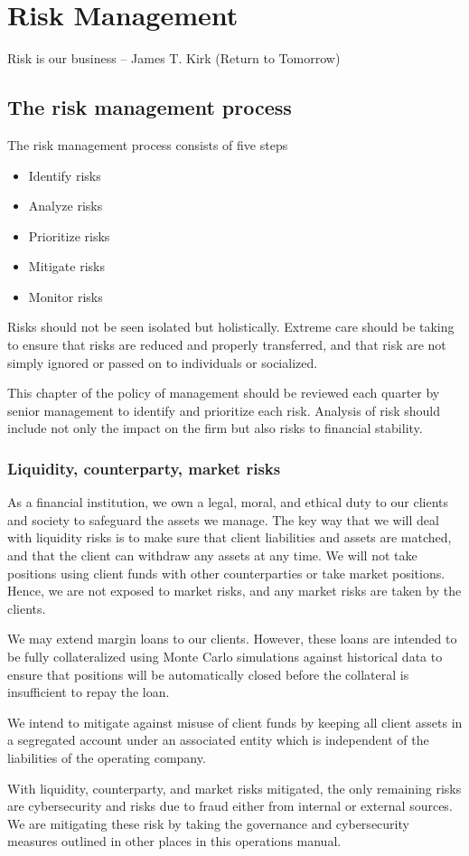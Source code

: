 \chapter{Risk Management}

Risk is our business – James T. Kirk (Return to Tomorrow)



\section{The risk management process}

The risk management process consists of five steps
\begin{itemize}
\item Identify risks
\item Analyze risks
\item Prioritize risks
\item Mitigate risks
\item Monitor risks
\end{itemize}

Risks should not be seen isolated but holistically.  Extreme care
should be taking to ensure that risks are reduced and properly
transferred, and that risk are not simply ignored or passed on to
individuals or socialized.

This chapter of the policy of management should be reviewed each quarter
by senior management to identify and prioritize each risk.
Analysis of risk should include not only the impact on the firm but also
risks to financial stability.

\subsection{Liquidity, counterparty, market risks}

As a financial institution, we own a legal, moral, and ethical duty to
our clients and society to safeguard the assets we manage.  The key
way that we will deal with liquidity risks is to make sure that client
liabilities and assets are matched, and that the client can
withdraw any assets at any time.  We will not take positions using
client funds with other counterparties or take market positions. Hence,
we are not exposed to market risks, and any market risks are taken by
the clients.

We may extend margin loans to our clients. However,
these loans are intended to be fully collateralized using Monte Carlo
simulations against historical data to ensure that positions will be
automatically closed before the collateral is insufficient to repay
the loan.

We intend to mitigate against misuse of client funds by keeping all
client assets in a segregated account under an associated entity which
is independent of the liabilities of the operating company.

With liquidity, counterparty, and market risks mitigated, the only
remaining risks are cybersecurity and risks due to fraud either from
internal or external sources.  We are mitigating these risk by taking
the governance and cybersecurity measures outlined in other places in
this operations manual.

